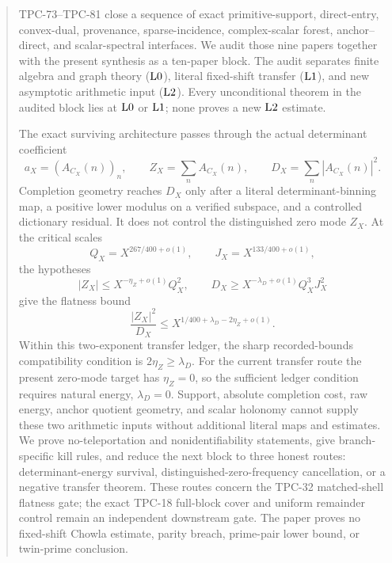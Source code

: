 \begin{abstract}
TPC-73--TPC-81 close a sequence of exact primitive-support,
direct-entry, convex-dual, provenance, sparse-incidence,
complex-scalar forest, anchor--direct, and scalar-spectral interfaces.
We audit those nine
papers together with the present synthesis as a ten-paper block.  The
audit separates finite algebra and graph theory (\(\Lzero\)), literal
fixed-shift transfer (\(\Lone\)), and new asymptotic arithmetic input
(\(\Ltwo\)).  Every unconditional theorem in the audited block lies at
\(\Lzero\) or \(\Lone\); none proves a new \(\Ltwo\) estimate.

The exact surviving architecture passes through the actual
determinant coefficient
\[
 a_X=(A_{C_X}(n))_n,\qquad
 Z_X=\sum_n A_{C_X}(n),\qquad
 D_X=\sum_n|A_{C_X}(n)|^2.
\]
Completion geometry reaches \(D_X\) only after a literal
determinant-binning map, a positive lower modulus on a verified
subspace, and a controlled dictionary residual.  It does not control
the distinguished zero mode \(Z_X\).  At the critical scales
\[
 Q_X=X^{267/400+o(1)},\qquad
 J_X=X^{133/400+o(1)},
\]
the hypotheses
\[
 |Z_X|\le X^{-\eta_Z+o(1)}Q_X^2,\qquad
 D_X\ge X^{-\lambda_D+o(1)}Q_X^3J_X^2
\]
give the flatness bound
\[
 \frac{|Z_X|^2}{D_X}
 \le X^{1/400+\lambda_D-2\eta_Z+o(1)}.
\]
Within this two-exponent transfer ledger, the sharp recorded-bounds
compatibility condition is \(2\eta_Z\ge\lambda_D\).  For the current
transfer route the present zero-mode target has \(\eta_Z=0\), so the
sufficient ledger condition requires natural energy,
\(\lambda_D=0\).
Support, absolute completion cost, raw energy, anchor quotient
geometry, and scalar holonomy cannot supply these two arithmetic
inputs without additional literal maps and estimates.  We prove
no-teleportation and nonidentifiability statements, give
branch-specific kill rules, and reduce the next block to three honest
routes: determinant-energy survival, distinguished-zero-frequency
cancellation, or a negative transfer theorem.  These routes concern
the TPC-32 matched-shell flatness gate; the exact TPC-18 full-block
cover and uniform remainder control remain an independent downstream
gate.  The paper proves no
fixed-shift Chowla estimate, parity breach, prime-pair lower bound, or
twin-prime conclusion.
\end{abstract}
